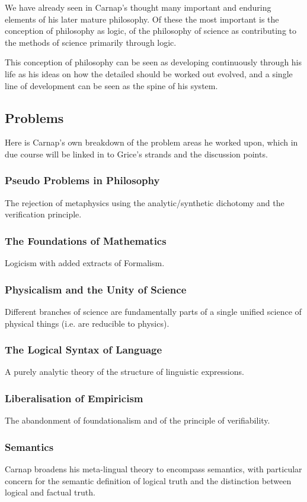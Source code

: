 \documentclass[10pt,titlepage]{book}
\begin{document}
We have already seen in Carnap's thought many important and enduring elements of his later mature philosophy.
Of these the most important is the conception of philosophy as logic, of the philosophy of science as contributing to the methods of science primarily through logic.

This conception of philosophy can be seen as developing continuously through his life as his ideas on how the detailed should be worked out evolved, and a single line of development can be seen as the spine of his system.

\subsection{Problems}

Here is Carnap's own breakdown of the problem areas he worked upon, which in due course will be linked in to Grice's strands and the discussion points.

\subsubsection{Pseudo Problems in Philosophy}
The rejection of metaphysics using the analytic/synthetic dichotomy and the verification principle.
\subsubsection{The Foundations of Mathematics}
Logicism with added extracts of Formalism.
\subsubsection{Physicalism and the Unity of Science}
Different branches of science are fundamentally parts of a single unified science of physical things (i.e. are reducible to physics).
\subsubsection{The Logical Syntax of Language}
A purely analytic theory of the structure of linguistic expressions.
\subsubsection{Liberalisation of Empiricism}
The abandonment of foundationalism and of the principle of verifiability.
\subsubsection{Semantics}
Carnap broadens his meta-lingual theory to encompass semantics, with particular concern for the semantic definition of logical truth and the distinction between logical and factual truth.
\end{document}
